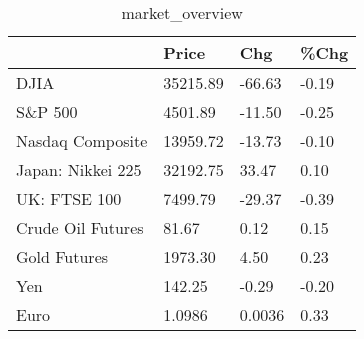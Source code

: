 \documentclass{article}%
\begin{document}
%


\begin{table}[htbp]%
\caption{market\_overview}%
\centering%
\begin{adjustbox}{width=1\textwidth}%
\begin{tabular}{llll}
\toprule
                  &    Price &    Chg &  \%Chg \\
\midrule
             DJIA & 35215.89 & -66.63 & -0.19 \\
          S\&P 500 &  4501.89 & -11.50 & -0.25 \\
 Nasdaq Composite & 13959.72 & -13.73 & -0.10 \\
Japan: Nikkei 225 & 32192.75 &  33.47 &  0.10 \\
     UK: FTSE 100 &  7499.79 & -29.37 & -0.39 \\
Crude Oil Futures &    81.67 &   0.12 &  0.15 \\
     Gold Futures &  1973.30 &   4.50 &  0.23 \\
              Yen &   142.25 &  -0.29 & -0.20 \\
             Euro &   1.0986 & 0.0036 &  0.33 \\
\bottomrule
\end{tabular}
%
\end{adjustbox}%
\end{table}

%
\end{document}
